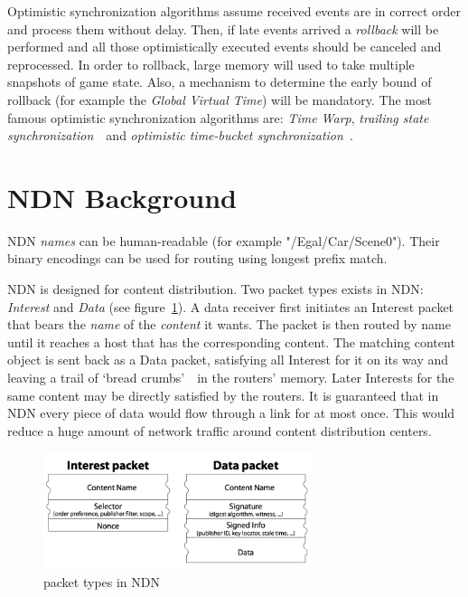 Optimistic synchronization algorithms assume received events are in correct order and process them without delay. Then, if late events arrived a \emph{rollback} will be performed and all those optimistically executed events should be canceled and reprocessed. In order to rollback, large memory will used to take multiple snapshots of game state. Also, a mechanism to determine the early bound of rollback (for example the \emph{Global Virtual Time}) will be mandatory. The most famous optimistic synchronization algorithms are: \emph{Time Warp}, \emph{trailing state synchronization}~\cite{Csync}~and \emph{optimistic time-bucket synchronization}~\cite{Doptbkt}.

\section{NDN Background}
\label{ndnbg}

NDN \emph{names} can be human-readable (for example "{/Egal/Car/Scene0}"). Their binary encodings can be used for routing using longest prefix match.

NDN is designed for content distribution. Two packet types exists in NDN: \emph{Interest} and \emph{Data} (see figure~\ref{packet_types}). A data receiver first initiates an Interest packet that bears the \emph{name} of the \emph{content} it wants. The packet is then routed by name until it reaches a host that has the corresponding content. The matching content object is sent back as a Data packet, satisfying all Interest for it on its way and leaving a trail of `bread crumbs'~\cite{Jndn}~in the routers' memory. Later Interests for the same content may be directly satisfied by the routers. It is guaranteed that in NDN every piece of data would flow through a link for at most once. This would reduce a huge amount of network traffic around content distribution centers.

\begin{figure} 
\begin{center}
\includegraphics[width=0.7\textwidth] {images/packet_types}
\caption{packet types in NDN}
\label{packet_types}
\end{center}
\end{figure}

